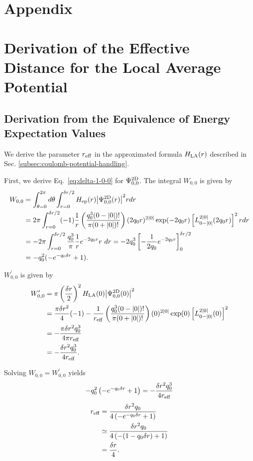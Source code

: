 \documentclass[jctc-draft.tex]{subfiles}
\begin{document}
\section*{Appendix}
\appendix
\section{Derivation of the Effective Distance for the Local Average Potential}
\label{chap:appendix_derivation_derivation}
\subsection{Derivation from the Equivalence of Energy Expectation Values}
We derive the parameter $r_{\mathrm{eff}}$ in the approximated formula
$H_{\mathrm{LA}}(r)$ described in Sec. \ref{subsec:coulomb-potential-handling}.

First, we derive Eq.~\eqref{eq:delta-1-0-0} for $\Psi^{\mathrm{2D}}_{0,0}$.
The integral $W_{0,0}$ is given by
\begin{align}
  W_{0,0}
   &= \int_{\theta=0}^{2\pi}d\theta
      \int_{r=0}^{\deltar/2}
      \Hep(r)\abs{\PsiTwoD_{0,0}(r)}^2r dr\notag\\
   &= 2\pi
      \int_{r=0}^{\deltar/2}
      (-1)\frac{1}{r}\left(\frac{q_0^3(0-\abs{0})!}{\pi(0+\abs{0})!}\right)
      (2q_0r)^{2\abs{0}}\exp(-2q_0r)
      \left[L_{0-\abs{0}}^{2\abs{0}}(2q_0r)\right]^2 r dr\notag\\
   &= -2\pi\int_{r=0}^{\deltar/2}\frac{q_0^3}{\pi}\frac{1}{r}e^{-2q_0r}r\ dr=-2q_0^3
      \left[-\frac{1}{2q_0}e^{-2q_0r}\right]_{0}^{\deltar/2}\notag\\
   &=-q_0^2(-e^{-q_0\deltar}+1) .
\end{align}

$W_{0,0}^\prime$ is given by
\begin{align}
    W_{0,0}^\prime
    &=\pi\left(\frac{\delta r}{2}\right)^2
       H_{\mathrm{LA}}(0){\left| \Psi^{\mathrm{2D}}_{0,0}(0) \right|}^2\notag\\
    &=\frac{\pi\delta r^2}{4}(-1)-\frac{1}{r_{\mathrm{eff}}}
    \left(\frac{q_0^3(0-{\left| 0 \right|})!}{\pi(0+{\left| 0 \right|})!}\right)
    (0)^{2{\left| 0 \right|}}\exp(0)\left[L_{0-{\left| 0 \right|}}^{2{\left| 0 \right|}}(0)\right]^2\notag\\
    &= -\frac{\pi\delta r^2q_0^3}{4\pi r_{\mathrm{eff}}}\notag\\
    &= -\frac{\delta r^2q_0^3}{4r_{\mathrm{eff}}} .
\end{align}

Solving $W_{0,0}=W_{0,0}^\prime$ yields
\begin{equation}
-q_0^2\left(-e^{-q_0\delta r}+1\right)=-\frac{\delta r^2q_0^3}{4r_{\mathrm{eff}}}
\end{equation}
\begin{align}
r_{\mathrm{eff}}&=\frac{\delta r^2q_0}{4\left(-e^{-q_0\delta r}+1\right)}\notag\\
&\simeq\frac{\delta r^2q_0}{4\left(-(1-q_0\delta r)+1\right)}\notag\\
&=\frac{\delta r}{4} .
\end{align}
\end{document}
